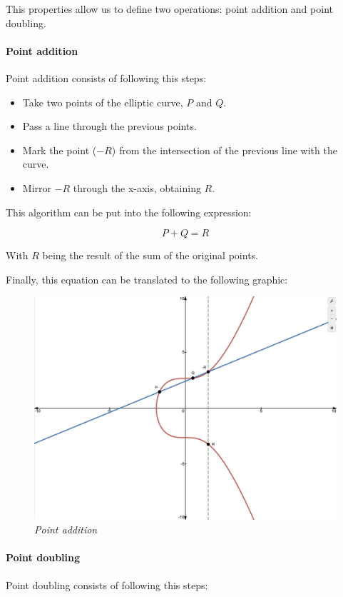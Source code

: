 \documentclass{article}
\newcommand\tab[1][1cm]{\hspace*{#1}}
\begin{document}
This properties allow us to define two operations: point addition and point doubling.

\paragraph{Point addition}

\tab Point addition consists of following this steps:

\begin{itemize}
    \item Take two points of the elliptic curve, \(P\) and \(Q\).
    \item Pass a line through the previous points.
    \item Mark the point (\(-R\)) from the intersection of the previous line with the curve.
    \item Mirror \(-R\) through the x-axis, obtaining \(R\).
\end{itemize}

This algorithm can be put into the following expression:

\[P + Q = R\]

With \(R\) being the result of the sum of the original points.

Finally, this equation can be translated to the following graphic:

\begin{figure}[H]
    \begin{center}
        \includegraphics[width=0.5 \textwidth]{images/point_addition.png}
        \caption{\textit{Point addition}}
    \end{center}
\end{figure}

\paragraph{Point doubling}

\tab Point doubling consists of following this steps:
\end{document}
